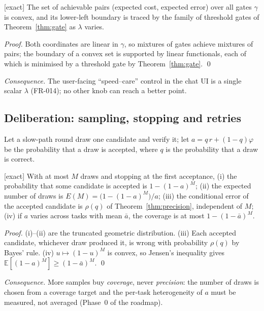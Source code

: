 \begin{proposition} \textnormal{[exact]}
\label{prop:frontier}
The set of achievable pairs (expected cost, expected error) over all gates
$\gamma$ is convex, and its lower-left boundary is traced by the family of
threshold gates of Theorem~\ref{thm:gate} as $\lambda$ varies.
\end{proposition}
\begin{proof}
Both coordinates are linear in $\gamma$, so mixtures of gates achieve
mixtures of pairs; the boundary of a convex set is supported by linear
functionals, each of which is minimised by a threshold gate by
Theorem~\ref{thm:gate}. \qed
\end{proof}
\emph{Consequence.} The user-facing ``speed--care'' control in the chat UI is
a single scalar $\lambda$ (FR-014); no other knob can reach a better point.

\subsection{Deliberation: sampling, stopping and retries}

Let a slow-path round draw one candidate and verify it; let
$a=q\,r+(1-q)\varphi$ be the probability that a draw is accepted, where $q$ is
the probability that a draw is correct.

\begin{theorem}
\textnormal{[exact]}
\label{thm:coverage}
With at most $M$ draws and stopping at the first acceptance,
(i) the probability that some candidate is accepted is $1-(1-a)^M$;
(ii) the expected number of draws is $E(M)=\big(1-(1-a)^M\big)/a$;
(iii) the conditional error of the accepted candidate is $\rho(q)$ of
Theorem~\ref{thm:precision}, independent of $M$;
(iv) if $a$ varies across tasks with mean $\bar a$, the coverage is at most
$1-(1-\bar a)^M$.
\end{theorem}
\begin{proof}
(i)--(ii) are the truncated geometric distribution. (iii) Each accepted
candidate, whichever draw produced it, is wrong with probability $\rho(q)$ by
Bayes' rule. (iv) $u\mapsto(1-u)^M$ is convex, so Jensen's inequality gives
$\mathbb E[(1-a)^M]\ge(1-\bar a)^M$. \qed
\end{proof}
\emph{Consequence.} More samples buy \emph{coverage}, never \emph{precision}:
the number of draws is chosen from a coverage target and the per-task
heterogeneity of $a$ must be measured, not averaged (Phase~0 of the roadmap).

